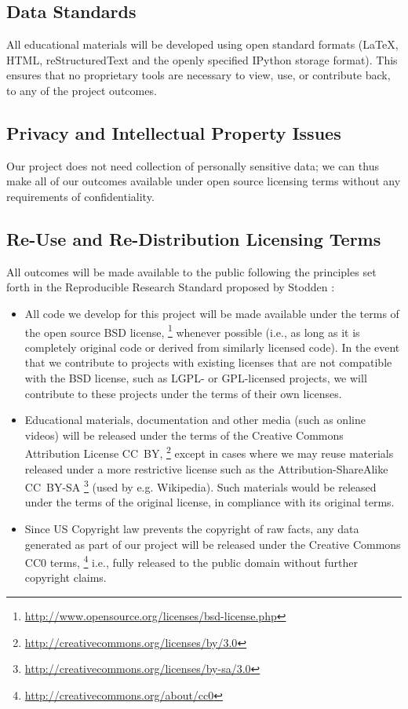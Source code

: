 \documentclass[11pt]{article}
\begin{document}
\subsection*{Data Standards}

All educational materials will be developed using open standard formats
(\LaTeX{}, HTML, reStructuredText and the openly specified IPython
storage format). This ensures that no proprietary tools are necessary to view,
use, or contribute back, to any of the project outcomes.


\subsection*{Privacy and Intellectual Property Issues}

Our project does not need collection of personally sensitive data; we can
thus make all of our outcomes available under open source licensing
terms without any requirements of confidentiality.


\subsection*{Re-Use and Re-Distribution Licensing Terms}

All outcomes will be made available to the public following the principles
set forth in the Reproducible Research Standard proposed by Stodden
\cite{Stodden-09}:
\begin{itemize}
\item All code we develop for this project will be made available under
the terms of the open source BSD license,%
\footnote{\url{http://www.opensource.org/licenses/bsd-license.php}%
} whenever possible (i.e., as long as it is completely original code
or derived from similarly licensed code). In the event that we contribute
to projects with existing licenses that are not compatible with the
BSD license, such as LGPL- or GPL-licensed projects, we will contribute
to these projects under the terms of their own licenses.
\item Educational materials, documentation and other media (such as online
videos) will be released under the terms of the Creative Commons Attribution
License CC~BY,%
\footnote{\url{http://creativecommons.org/licenses/by/3.0}%
} except in cases where we may reuse materials released under a more
restrictive license such as the Attribution-ShareAlike CC~BY-SA%
\footnote{\url{http://creativecommons.org/licenses/by-sa/3.0}%
} (used by e.g. Wikipedia). Such materials would be released under
the terms of the original license, in compliance with its original
terms.
\item Since US Copyright law prevents the copyright of raw facts, any data
generated as part of our project will be released under the Creative
Commons CC0 terms,%
\footnote{\url{http://creativecommons.org/about/cc0}%
} i.e., fully released to the public domain without further copyright
claims.
\end{itemize}
\end{document}
